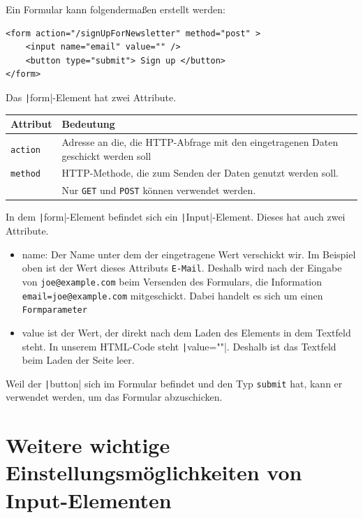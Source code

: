 \documentclass[a4paper]{scrartcl}
\begin{document}
Ein Formular kann folgendermaßen erstellt werden:

\begin{verbatim}
<form action="/signUpForNewsletter" method="post" >
    <input name="email" value="" />
    <button type="submit"> Sign up </button>
</form>
\end{verbatim}

Das  \texttt|form|-Element hat zwei Attribute.

\begin{table}[H]
\begin{tabular}{ll}
Attribut & Bedeutung \\
\hline
\texttt{action} & Adresse an die, die  HTTP-Abfrage mit den eingetragenen Daten geschickt werden soll \\

\texttt{method} & HTTP-Methode, die zum Senden der Daten genutzt werden soll.
\\
 & Nur \texttt{GET} und \texttt{POST} können verwendet werden.\\


\end{tabular}
\end{table}



In dem \texttt|form|-Element befindet sich ein \texttt|Input|-Element.
Dieses hat auch zwei Attribute.

\begin{itemize}
\item{name}: Der Name unter dem der eingetragene Wert verschickt wir. Im Beispiel oben ist der Wert dieses Attributs \texttt{E-Mail}. Deshalb wird nach der Eingabe von \texttt{joe@example.com} beim Versenden des Formulars, die Information \texttt{email=joe@example.com} mitgeschickt. Dabei handelt es sich um einen \texttt{Formparameter}
\item {value} ist der Wert, der direkt nach dem Laden des Elements in dem Textfeld steht. In unserem HTML-Code steht \texttt|value=""|. Deshalb ist das Textfeld beim Laden der Seite leer.
\end{itemize}


Weil der \texttt|button| sich im Formular befindet und den Typ \texttt{submit} hat, kann er verwendet werden, um das Formular abzuschicken.

\section{Weitere wichtige Einstellungsmöglichkeiten von Input-Elementen}
\end{document}
